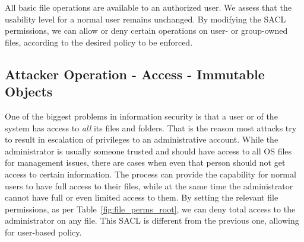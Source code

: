 \par All basic file operations are available to an authorized user. We assess that the usability level for a normal user remains unchanged. By modifying the \ac{SACL} permissions, we can allow or deny certain operations on user- or group-owned files, according to the desired policy to be enforced.

\subsection{Attacker Operation -  Access - Immutable Objects}

\par One of the biggest problems in information security is that a  user or  of the system has access to \emph{all} its files and folders. That is the reason most attacks try to result in escalation of privileges to an administrative account. While the administrator is usually someone trusted and should have access to all \ac{OS} files for management issues, there are cases when even that person should not get access to certain information. The  process can provide the capability for normal users to have full access to their files, while at the same time the administrator cannot have full or even limited access to them. By setting the relevant file permissions, as per Table~\ref{fig:file_perms_root}, we can deny total access to the administrator on any file. This \ac{SACL} is different from the previous one, allowing for user-based policy.

